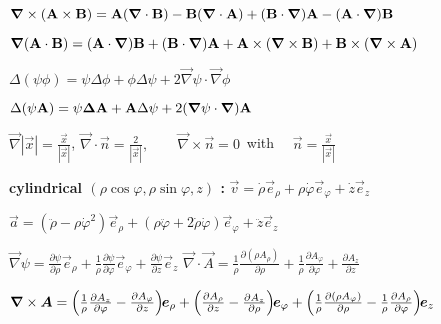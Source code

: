 \begin{squishlist}
\item $\vec \nabla \times (\vec{\rm{A}} \times \vec{\rm{B}}) = \vec{\rm{A}} (\vec \nabla \cdot \vec{\rm{B}}) - \vec{\rm{B}} (\vec \nabla \cdot \vec{\rm{A}}) + (\vec{\rm{B}} \cdot \vec \nabla)\vec{\rm{A}} - (\vec{\rm{A}} \cdot \vec \nabla)\vec{\rm{B}}$ 

\item $\vec \nabla (\vec{\rm{A}} \cdot \vec{\rm{B}}) = (\vec{\rm{A}} \cdot \vec \nabla)\vec{\rm{B}} + (\vec{\rm{B}} \cdot \vec \nabla)\vec{\rm{A}} + \vec{\rm{A}} \times (\vec \nabla \times \vec{\rm{B}}) + \vec{\rm{B}} \times (\vec \nabla \times \vec{\rm{A}})$

\item $\Delta(\psi\phi) = \psi\Delta\phi + \phi\Delta\psi + 2\vec{\nabla} \psi \cdot \vec{\nabla} \phi$

\item $\Delta(\psi\vec{\rm{A}}) = \psi \vec{\Delta} \vec{\rm{A}} + \vec{\rm{A}}\Delta\psi + 2(\vec{\nabla}\psi \cdot \vec{\nabla})\vec{\rm{A}}$

\item $\vec{\nabla}|\vec{x}| = \frac{\vec{x}}{|\vec{x}|}$, $\vec{\nabla}\cdot\vec{n} = \frac{2}{|\vec{x}|}, \qquad \vec{\nabla} \times \vec{n} = 0 \,$ with $\quad \vec{n} = \frac{\vec{x}}{|\vec{x}|}$


\item[] \textbf{cylindrical $(\rho\cos\varphi, \rho\sin\varphi, z)$ : \:}
$\vec{v} = \dot{\rho}\vec{e}_\rho + \rho\dot{\varphi}\vec{e}_\varphi + \dot{z}\vec{e}_z$

\item $\vec{a} = (\ddot{\rho} - \rho\dot{\varphi}^2)\vec{e}_\rho + (\rho\ddot{\varphi} + 2\dot{\rho}\dot{\varphi})\vec{e}_\varphi + \ddot{z}\vec{e}_z$
 
\item $\vec{\nabla}\psi=\frac{\partial \psi}{\partial \rho}\vec{e}_\rho+\frac{1}{\rho}\frac{\partial \psi}{\partial \varphi}\vec{e}_{\varphi}+\frac{\partial \psi}{\partial z}\vec{e}_z$ \squishsep $\vec{\nabla} \cdot \vec{A}=\frac{1}{\rho}\frac{\partial(\rho A_\rho)}{\partial \rho} + \frac{1}{\rho}\frac{\partial A_{\varphi}}{\partial \varphi}+\frac{\partial A_z}{\partial z}$

\item $\vec{\nabla} \times \vec{A}=\left(\frac{1}{\rho}\frac{\partial A_z}{\partial\varphi}-\frac{\partial A_{\varphi}}{\partial z}\right)\hspace{-0.1cm}\vec{e}_\rho+\left(\frac{\partial A_\rho}{\partial z}-\frac{\partial A_z}{\partial \rho}\right)\hspace{-0.1cm}\vec{e}_{\varphi}+\left(\frac{1}{\rho}\frac{\partial(\rho A_{\varphi})}{\partial \rho}-\frac{1}{\rho}\frac{\partial A_\rho}{\partial\varphi}\right)\hspace{-0.1cm}\vec{e}_z$


\end{squishlist}
